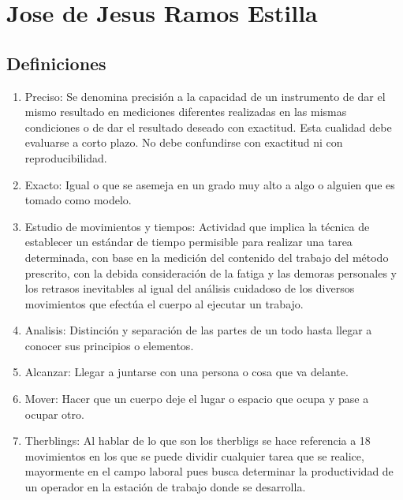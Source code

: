 \section{Jose de Jesus Ramos Estilla}
\subsection{Definiciones}

\begin{enumerate}
    \item Preciso: Se denomina precisión a la capacidad de un instrumento de dar el mismo resultado en mediciones diferentes realizadas en las mismas condiciones o de dar el resultado deseado con exactitud. Esta cualidad debe evaluarse a corto plazo. No debe confundirse con exactitud ni con reproducibilidad. 
    \cite{de_2004}
    
    \item Exacto: Igual o que se asemeja en un grado muy alto a algo o alguien que es tomado como modelo.
    \cite{asale_rae_2023}

    
    \item Estudio de movimientos y tiempos: Actividad que implica la técnica de establecer un estándar de tiempo permisible para realizar una tarea determinada, con base en la medición del contenido del trabajo del método prescrito, con la debida consideración de la fatiga y las demoras personales y los retrasos inevitables al igual del análisis cuidadoso de los diversos movimientos que efectúa el cuerpo al ejecutar un trabajo.  
    \cite{lópez_2020}

    \item Analisis: Distinción y separación de las partes de un todo hasta llegar a conocer sus principios o elementos.
     \cite{RAE}

    \item Alcanzar: Llegar a juntarse con una persona o cosa que va delante.
    \cite{soto_2022}

    \item Mover: Hacer que un cuerpo deje el lugar o espacio que ocupa y pase a ocupar otro.
    \cite{rae_rae_2020}

    \item Therblings: Al hablar de lo que son los therbligs se hace referencia a 18 movimientos en los que se puede dividir cualquier tarea que se realice, mayormente en el campo laboral pues busca determinar la productividad de un operador en la estación de trabajo donde se desarrolla.
    \cite{soto_2022}



\end{enumerate}

